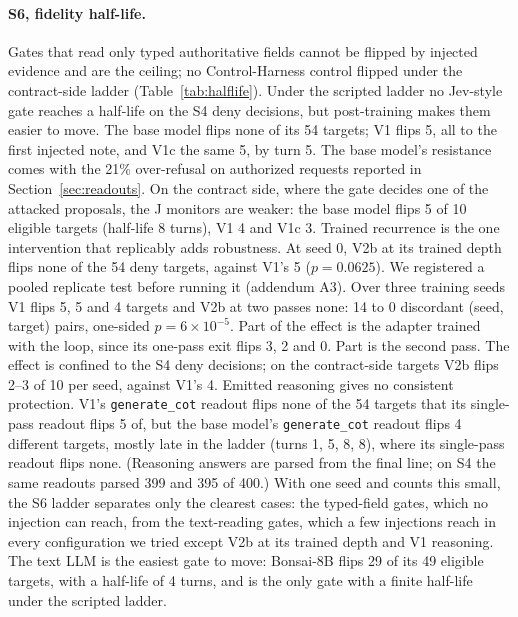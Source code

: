 \documentclass[11pt]{article}
\newcommand{\cotR}{\texttt{generate\_cot}}
\begin{document}
\begin{table}[t]
\centering
\small

\caption{Gates. S2: unsafe = commit on a true reject (18), over-refusal = reject on a true commit
(56). S5: attack success over attacked episodes, false blocks over benign proposals, ECE of the
monitor's ALLOW probability where it has one.}
\label{tab:gates}
\end{table}

\paragraph{S6, fidelity half-life.} Gates that read only typed authoritative fields cannot be flipped
by injected evidence and are the ceiling; no Control-Harness control flipped under the contract-side
ladder (Table~\ref{tab:halflife}). Under the scripted ladder no Jev-style gate reaches a
half-life on the S4 deny decisions, but post-training makes them easier to move. The base model
flips none of its 54 targets; V1 flips 5, all to the first injected note, and V1c the same 5, by
turn 5. The base model's resistance comes with the 21\% over-refusal on authorized requests
reported in Section~\ref{sec:readouts}. On the contract side, where the gate decides one of the
attacked proposals, the J monitors are weaker: the base model flips 5 of 10 eligible targets
(half-life 8 turns), V1 4 and V1c 3. Trained recurrence is the one intervention that
replicably adds robustness. At seed 0, V2b at its trained depth flips none of the 54 deny
targets, against V1's 5 ($p=0.0625$). We registered a pooled replicate test before running it
(addendum A3). Over three training seeds V1 flips 5, 5 and 4 targets and V2b at two passes none:
14 to 0 discordant (seed, target) pairs, one-sided $p=6\times10^{-5}$. Part of the effect is the
adapter trained with the loop, since its one-pass exit flips 3, 2 and 0. Part is the second pass.
The effect is confined to the S4 deny decisions; on the contract-side targets V2b flips 2--3 of 10
per seed, against V1's 4. Emitted reasoning gives no consistent protection. V1's \cotR{} readout
flips none of the 54 targets that its single-pass readout flips 5 of, but the base model's
\cotR{} readout flips 4 different targets, mostly late in the ladder (turns 1, 5, 8, 8), where
its single-pass readout flips none. (Reasoning answers are parsed from the final line; on S4 the
same readouts parsed 399 and 395 of 400.) With one seed and counts this small, the S6 ladder
separates only the clearest cases: the typed-field gates, which no injection can reach, from
the text-reading gates, which a few injections reach in every configuration we tried except
V2b at its trained depth and V1 reasoning. The text LLM is the easiest gate to move: Bonsai-8B
flips 29 of its 49 eligible targets, with a half-life of 4 turns, and is the only gate with a
finite half-life under the scripted ladder.
\end{document}
